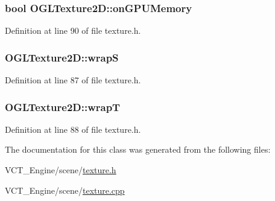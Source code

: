 \subsubsection[{on\+G\+P\+U\+Memory}]{\setlength{\rightskip}{0pt plus 5cm}bool O\+G\+L\+Texture2\+D\+::on\+G\+P\+U\+Memory\hspace{0.3cm}{\ttfamily [protected]}}\label{class_o_g_l_texture2_d_a986498afd6ef99ef2bfc05b62a4c5b8b}


Definition at line 90 of file texture.\+h.

\hypertarget{class_o_g_l_texture2_d_a9ce6cda4bc4c3149447c20017c35efd8}{}
\subsubsection[{wrap\+S}]{ O\+G\+L\+Texture2\+D\+::wrap\+S\hspace{0.3cm}{\ttfamily [protected]}}\label{class_o_g_l_texture2_d_a9ce6cda4bc4c3149447c20017c35efd8}


Definition at line 87 of file texture.\+h.

\hypertarget{class_o_g_l_texture2_d_a66d477be8c69a34eb6dc5660926bf28f}{}
\subsubsection[{wrap\+T}]{ O\+G\+L\+Texture2\+D\+::wrap\+T\hspace{0.3cm}{\ttfamily [protected]}}\label{class_o_g_l_texture2_d_a66d477be8c69a34eb6dc5660926bf28f}


Definition at line 88 of file texture.\+h.



The documentation for this class was generated from the following files\+:\begin{DoxyCompactItemize}
\item 
V\+C\+T\+\_\+\+Engine/scene/\hyperlink{texture_8h}{texture.\+h}\item 
V\+C\+T\+\_\+\+Engine/scene/\hyperlink{texture_8cpp}{texture.\+cpp}\end{DoxyCompactItemize}

